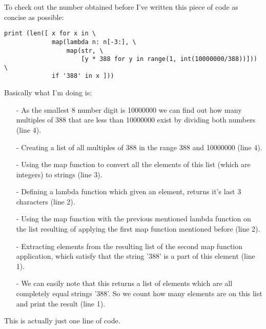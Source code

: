\documentclass{article}
\begin{document}
To check out the number obtained before I've written this piece of code as concise as possible:
\vskip 0.2in
\begin{lstlisting}
print (len([ x for x in \
             map(lambda n: n[-3:], \
                 map(str, \
                     [y * 388 for y in range(1, int(10000000/388))])) \
             if '388' in x ]))
\end{lstlisting}
\vskip 0.2in
Basically what I'm doing is:
\begin{itemize}
\item [-] As the smallest 8 number digit is 10000000 we can find out how many multiples of 388 that are less than 10000000 exist by dividing both numbers (line 4).
\item [-] Creating a list of all multiples of 388 in the range 388 and 10000000 (line 4).
\item [-] Using the map function to convert all the elements of this list (which are integers) to strings (line 3).
\item [-] Defining a lambda function which given an element, returns it's last 3 characters (line 2).
\item [-] Using the map function with the previous mentioned lambda function on the list resulting of applying the first map function mentioned before (line 2).
\item [-] Extracting elements from the resulting list of the second map function application, which satisfy that the string '388' is a part of this element (line 1).
\item [-] We can easily note that this returns a list of elements which are all completely equal strings '388'. So we count how many elements are on this list and print the result (line 1).
\end{itemize}
\vskip 0.2in
This is actually just one line of code.
\end{document}
